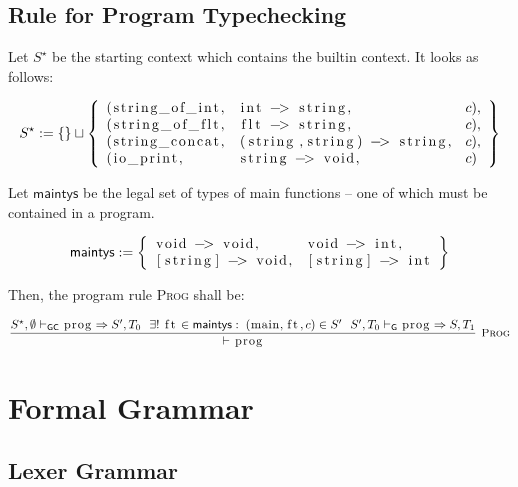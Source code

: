 \documentclass{article}
\newcommand{\code}[1]{\lstinline[columns=fixed]{#1}}
\newcommand{\drmrule}[5]{\frac{#1}{#2\vdash_{\mathsf{#3}}#4}\textsc{\ \small{#5}}}
\newcommand{\ruleapp}[1]{\vdash_{\mathsf{#1}}}
\newcommand{\mc}[1]{\textnormal{\code{#1}}}
\begin{document}
		\subsection{Rule for Program Typechecking}
		
			Let $S^\star$ be the starting context which contains the builtin context. It looks as follows:
			
			\begin{align*}
				S^\star := \{\}\sqcup \left\{
					\begin{array}{lll}
						(\mc{string\_of\_int},&\mc{int -> string},&c),\\ (\mc{string\_of\_flt},&\mc{flt -> string},&c),\\
						(\mc{string\_concat},&\mc{(string,string) -> string},&c),\\
						(\mc{io\_print},&\mc{string -> void},&c)
					\end{array}
				\right\}
			\end{align*}
			
			Let $\mathsf{maintys}$ be the legal set of types of main functions -- one of which must be contained in a program.
			
			\begin{align*}
				\mathsf{maintys} := \left\{
					\begin{array}{ll}
						\mc{void -> void}, & \mc{void -> int},\\
						\mc{[string] -> void}, & \mc{[string] -> int}
					\end{array}
				\right\}
			\end{align*}
		
			Then, the program rule \textsc{Prog} shall be:
		
			\begin{align*}
				\drmrule{S^\star,\emptyset \ruleapp{GC} \mc{prog} \Rightarrow S',T_0 \ \ \exists!\; \mc{ft}\in\mathsf{maintys}:\;(\mc{main},\mc{ft},c)\in S'\ \ S',T_0 \ruleapp{G} \mc{prog} \Rightarrow S,T_1}{}{}{\mc{prog}}{Prog}
			\end{align*}
		
	\section{Formal Grammar}
	
		\subsection{Lexer Grammar}
		
\end{document}
